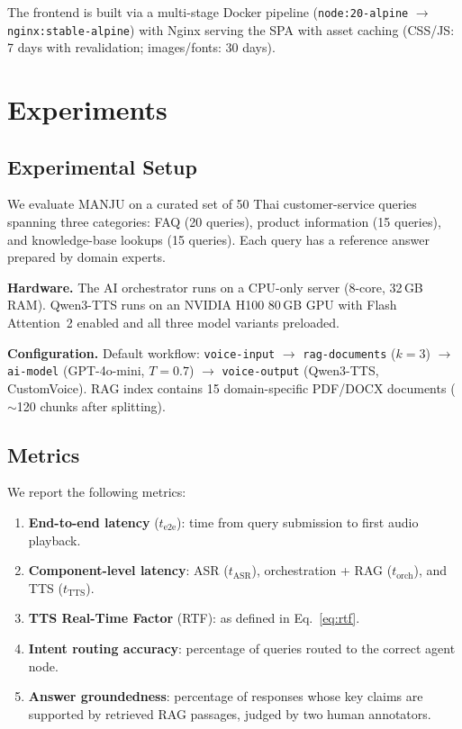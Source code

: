 \documentclass[10pt, a4paper, twocolumn]{article}
\begin{document}
\noindent The frontend is built via a multi-stage Docker pipeline (\texttt{node:20-alpine} $\rightarrow$ \texttt{nginx:stable-alpine}) with Nginx serving the SPA with asset caching (CSS/JS: 7 days with revalidation; images/fonts: 30 days).

\section{Experiments}
\label{sec:experiments}

\subsection{Experimental Setup}

We evaluate MANJU on a curated set of 50 Thai customer-service queries spanning three categories: FAQ (20 queries), product information (15 queries), and knowledge-base lookups (15 queries).
Each query has a reference answer prepared by domain experts.

\noindent\textbf{Hardware.}
The AI orchestrator runs on a CPU-only server (8-core, 32\,GB RAM).
Qwen3-TTS runs on an NVIDIA H100 80\,GB GPU with Flash Attention~2 enabled and all three model variants preloaded.

\noindent\textbf{Configuration.}
Default workflow: \texttt{voice-input} $\rightarrow$ \texttt{rag-documents} ($k{=}3$) $\rightarrow$ \texttt{ai-model} (GPT-4o-mini, $T{=}0.7$) $\rightarrow$ \texttt{voice-output} (Qwen3-TTS, CustomVoice).
RAG index contains 15 domain-specific PDF/DOCX documents (${\sim}$120 chunks after splitting).

\subsection{Metrics}

We report the following metrics:
\begin{enumerate}[label=(\roman*), nosep]
    \item \textbf{End-to-end latency} ($t_\text{e2e}$): time from query submission to first audio playback.
    \item \textbf{Component-level latency}: ASR ($t_\text{ASR}$), orchestration + RAG ($t_\text{orch}$), and TTS ($t_\text{TTS}$).
    \item \textbf{TTS Real-Time Factor} (RTF): as defined in Eq.~\eqref{eq:rtf}.
    \item \textbf{Intent routing accuracy}: percentage of queries routed to the correct agent node.
    \item \textbf{Answer groundedness}: percentage of responses whose key claims are supported by retrieved RAG passages, judged by two human annotators.
\end{enumerate}
\end{document}
